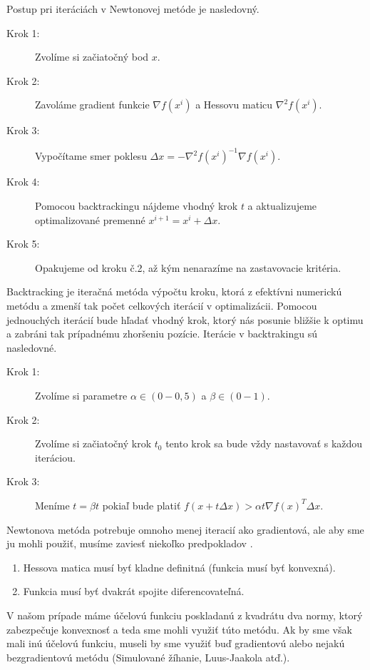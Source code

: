Postup pri iteráciách v Newtonovej metóde je nasledovný.
\begin{description}
	\item[Krok 1:] {Zvolíme si začiatočný bod $x$.}
	\item[Krok 2:] {Zavoláme gradient funkcie $\nabla f(x^{i})$ a Hessovu maticu $\nabla^{2} f(x^{i})$.}
	\item[Krok 3:] {Vypočítame smer poklesu $\Delta x = -\nabla^{2}f(x^{i})^{-1} \nabla f(x^{i})$.}
	\item[Krok 4:] {Pomocou backtrackingu nájdeme vhodný krok $t$ a aktualizujeme optimalizované premenné $x^{i+1} = x^{i} + \Delta x $.}
	\item[Krok 5:] {Opakujeme od kroku č.2, až kým nenarazíme na zastavovacie kritéria.}
\end{description}
Backtracking je iteračná metóda výpočtu kroku, ktorá z efektívni numerickú metódu a zmenší tak počet celkových iterácií v optimalizácii. Pomocou jednouchých iterácií bude hľadať vhodný krok, ktorý nás posunie bližšie k optimu a zabráni tak prípadnému zhoršeniu pozície. Iterácie v backtrakingu sú nasledovné.
\begin{description}
	\item[Krok 1:] {Zvolíme si parametre $\alpha \in (0-0,5)$ a $\beta \in (0-1)$.}
	\item[Krok 2:] {Zvolíme si začiatočný krok $t_0$ tento krok sa bude vždy nastavovať s každou iteráciou.}
	\item[Krok 3:] {Meníme $t=\beta t$ pokiaľ bude platiť $f(x+t\Delta x) > \alpha t\nabla f(x)^{T}\Delta x$.}
\end{description}
Newtonova metóda potrebuje omnoho menej iteracií ako gradientová, ale aby sme ju mohli použiť, musíme zaviesť niekoľko predpokladov \cite{bib12}.
\begin{enumerate}
	\item{
		Hessova matica musí byť kladne definitná (funkcia musí byť konvexná).
	}
	\item{
		Funkcia musí byť dvakrát spojite diferencovateľná.
	}
\end{enumerate}
V našom prípade máme účelovú funkciu poskladanú z kvadrátu dva normy, ktorý zabezpečuje konvexnosť a teda sme mohli využiť túto metódu. Ak by sme však mali inú účelovú funkciu, museli by sme využiť buď gradientovú  alebo nejakú bezgradientovú metódu (Simulované žíhanie, Luus-Jaakola atď.).


